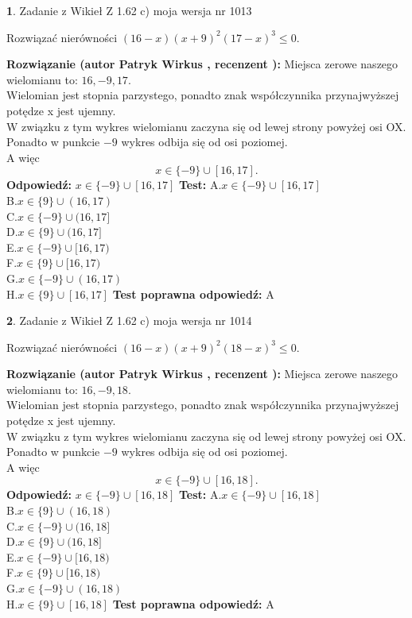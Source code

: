 \documentclass[12pt, a4paper]{article}
\theoremstyle{definition} %
\newtheorem{zad}{}
\newcommand{\zadStart}[1]{\begin{zad}#1\newline}
\newcommand{\zadStop}{\end{zad}}
\newcommand{\rozwStart}[2]{\noindent \textbf{Rozwiązanie (autor #1 , recenzent #2): }\newline}
\newcommand{\rozwStop}{\newline}
\newcommand{\odpStart}{\noindent \textbf{Odpowiedź:}\newline}
\newcommand{\odpStop}{\newline}
\newcommand{\testStart}{\noindent \textbf{Test:}\newline}
\newcommand{\testStop}{\newline}
\newcommand{\kluczStart}{\noindent \textbf{Test poprawna odpowiedź:}\newline}
\newcommand{\kluczStop}{\newline}
\begin{document}
\zadStart{Zadanie z Wikieł Z 1.62 c) moja wersja nr 1013}

Rozwiązać nierówności $(16-x)(x+9)^{2}(17-x)^{3}\le0$.
\zadStop
\rozwStart{Patryk Wirkus}{}
Miejsca zerowe naszego wielomianu to: $16, -9, 17$.\\
Wielomian jest stopnia parzystego, ponadto znak współczynnika przy\linebreak najwyższej potędze x jest ujemny.\\ W związku z tym wykres wielomianu zaczyna się od lewej strony powyżej osi OX.\\
Ponadto w punkcie $-9$ wykres odbija się od osi poziomej.\\
A więc $$x \in \{-9\} \cup [16,17].$$
\rozwStop
\odpStart
$x \in \{-9\} \cup [16,17]$
\odpStop
\testStart
A.$x \in \{-9\} \cup [16,17]$\\
B.$x \in \{9\} \cup (16,17)$\\
C.$x \in \{-9\} \cup (16,17]$\\
D.$x \in \{9\} \cup (16,17]$\\
E.$x \in \{-9\} \cup [16,17)$\\
F.$x \in \{9\} \cup [16,17)$\\
G.$x \in \{-9\} \cup (16,17)$\\
H.$x \in \{9\} \cup [16,17]$
\testStop
\kluczStart
A
\kluczStop



\zadStart{Zadanie z Wikieł Z 1.62 c) moja wersja nr 1014}

Rozwiązać nierówności $(16-x)(x+9)^{2}(18-x)^{3}\le0$.
\zadStop
\rozwStart{Patryk Wirkus}{}
Miejsca zerowe naszego wielomianu to: $16, -9, 18$.\\
Wielomian jest stopnia parzystego, ponadto znak współczynnika przy\linebreak najwyższej potędze x jest ujemny.\\ W związku z tym wykres wielomianu zaczyna się od lewej strony powyżej osi OX.\\
Ponadto w punkcie $-9$ wykres odbija się od osi poziomej.\\
A więc $$x \in \{-9\} \cup [16,18].$$
\rozwStop
\odpStart
$x \in \{-9\} \cup [16,18]$
\odpStop
\testStart
A.$x \in \{-9\} \cup [16,18]$\\
B.$x \in \{9\} \cup (16,18)$\\
C.$x \in \{-9\} \cup (16,18]$\\
D.$x \in \{9\} \cup (16,18]$\\
E.$x \in \{-9\} \cup [16,18)$\\
F.$x \in \{9\} \cup [16,18)$\\
G.$x \in \{-9\} \cup (16,18)$\\
H.$x \in \{9\} \cup [16,18]$
\testStop
\kluczStart
A
\kluczStop
\end{document}
